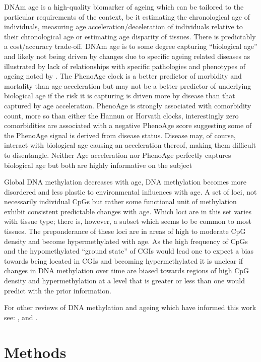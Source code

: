 \documentclass[
]{book}
\begin{document}
DNAm age is a high-quality biomarker of ageing which can be tailored to the particular requirements of the context, be it estimating the chronological age of individuals, measuring age acceleration/deceleration of individuals relative to their chronological age or estimating age disparity of tissues. There is predictably a cost/accuracy trade-off. DNAm age is to some degree capturing ``biological age'' and likely not being driven by changes due to specific ageing related diseases as illustrated by lack of relationships with specific pathologies and phenotypes of ageing noted by \citet{Bell2012}. The PhenoAge clock is a better predictor of morbidity and mortality than age acceleration but may not be a better predictor of underlying biological age if the risk it is capturing is driven more by disease than that captured by age acceleration. PhenoAge is strongly associated with comorbidity count, more so than either the Hannun or Horvath clocks, interestingly zero comorbidities are associated with a negative PhenoAge score suggesting some of the PhenoAge signal is derived from disease status. Disease may, of course, interact with biological age causing an acceleration thereof, making them difficult to disentangle. Neither Age acceleration nor PhenoAge perfectly captures biological age but both are highly informative on the subject

Global DNA methylation decreases with age, DNA methylation becomes more disordered and less plastic to environmental influences with age. A set of loci, not necessarily individual CpGs but rather some functional unit of methylation exhibit consistent predictable changes with age. Which loci are in this set varies with tissue type; there is, however, a subset which seems to be common to most tissues. The preponderance of these loci are in areas of high to moderate CpG density and become hypermethylated with age. As the high frequency of CpGs and the hypomethylated ``ground state'' of CGIs would lead one to expect a bias towards being located in CGIs and becoming hypermethylated it is unclear if changes in DNA methylation over time are biased towards regions of high CpG density and hypermethylation at a level that is greater or less than one would predict with the prior information.

For other reviews of DNA methylation and ageing which have informed this work see: \citep{Jung2015}, \citep{Jones2015} and \citep{Horvath2018}.

\hypertarget{part-methods}{%
\part{Methods}\label{part-methods}}
\end{document}
